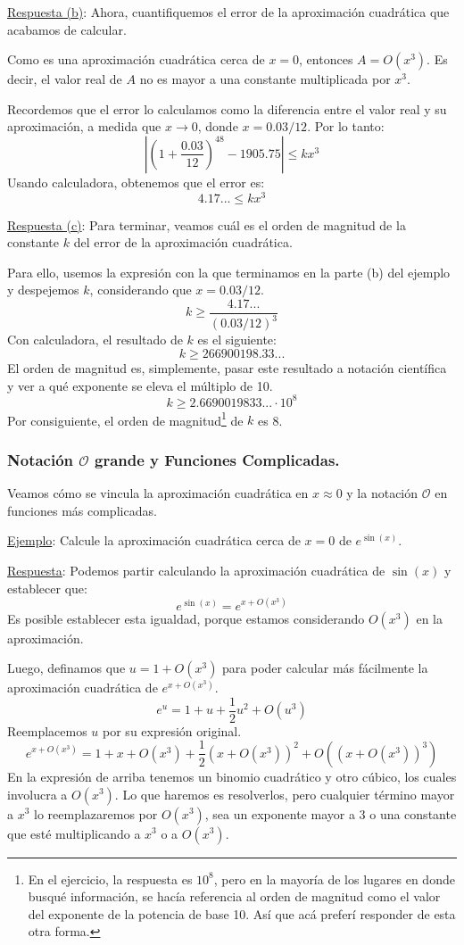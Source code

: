 \documentclass[12pt]{article}
\begin{document}
\underline{Respuesta (b)}: Ahora, cuantifiquemos el error de la aproximación cuadrática que acabamos de calcular.

Como es una aproximación cuadrática cerca de $x = 0$, entonces $A = O(x^{3})$. Es decir, el valor real de $A$ no es mayor a una constante multiplicada por $x^{3}$.

Recordemos que el error lo calculamos como la diferencia entre el valor real y su aproximación, a medida que $x \to 0$, donde $x = 0.03/12$. Por lo tanto:
\[
\left|\left(1 + \frac{0.03}{12}\right)^{48} - 1905.75\right|
	\leq kx^{3}
\]
Usando calculadora, obtenemos que el error es:
\[4.17 ... \leq kx^{3}\]

\underline{Respuesta (c)}: Para terminar, veamos cuál es el orden de magnitud de la constante $k$ del error de la aproximación cuadrática.

Para ello, usemos la expresión con la que terminamos en la parte (b) del ejemplo y despejemos $k$, considerando que $x = 0.03/12$.
\[k \geq \frac{4.17 ...}{(0.03/12)^{3}}\]
Con calculadora, el resultado de $k$ es el siguiente:
\[k \geq 266900198.33...\]
El orden de magnitud es, simplemente, pasar este resultado a notación científica y ver a qué exponente se eleva el múltiplo de 10.
\[k \geq 2.6690019833... \cdot 10^{8}\]
Por consiguiente, el orden de magnitud\footnote{En el ejercicio, la respuesta es $10^{8}$, pero en la mayoría de los lugares en donde busqué información, se hacía referencia al orden de magnitud como el valor del exponente de la potencia de base 10. Así que acá preferí responder de esta otra forma.} de $k$ es 8.

\subsubsection{Notación $\mathcal{O}$ grande y Funciones Complicadas.}

Veamos cómo se vincula la aproximación cuadrática en $x \approx 0$ y la notación $\mathcal{O}$ en funciones más complicadas.

\underline{Ejemplo}: Calcule la aproximación cuadrática cerca de $x = 0$ de $e^{\sin(x)}$.

\underline{Respuesta}: Podemos partir calculando la aproximación cuadrática de $\sin(x)$ y establecer que:
\[e^{\sin(x)} = e^{x + O(x^{3})}\]
Es posible establecer esta igualdad, porque estamos considerando $O(x^{3})$ en la aproximación.

\newpage

Luego, definamos que $u = 1 + O(x^{3})$ para poder calcular más fácilmente la aproximación cuadrática de $e^{x + O(x^{3})}$.
\[e^{u} = 1 + u + \frac{1}{2}u^{2} + O(u^{3})\]
Reemplacemos $u$ por su expresión original.
\[
e^{x + O(x^{3})} = 1 + x + O(x^{3}) + \frac{1}{2} (x + O(x^{3}))^{2}
                   + O\left((x + O(x^{3}))^3\right)
\]
En la expresión de arriba tenemos un binomio cuadrático y otro cúbico, los cuales involucra a $O(x^{3})$. Lo que haremos es resolverlos, pero cualquier término mayor a $x^{3}$ lo reemplazaremos por $O(x^{3})$, sea un exponente mayor a 3 o una constante que esté multiplicando a $x^{3}$ o a $O(x^{3})$.
\end{document}
